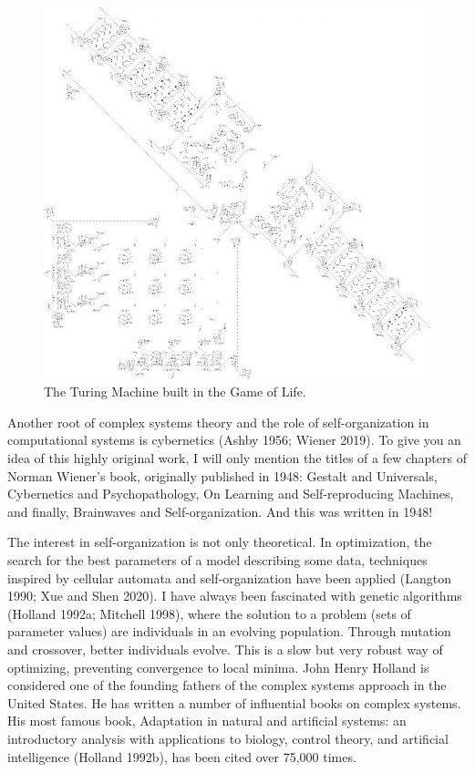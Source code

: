 \documentclass[
  a4paper,
  DIV=11,
  numbers=noendperiod,
  oneside]{scrreprt}
\begin{document}
\begin{figure}

{\centering \includegraphics{media/ch5n/image4.jpg}

}

\caption{\label{fig-ch5n-img4-old-42}The Turing Machine built in the
Game of Life.}

\end{figure}

Another root of complex systems theory and the role of self-organization
in computational systems is cybernetics (Ashby 1956; Wiener 2019). To
give you an idea of this highly original work, I will only mention the
titles of a few chapters of Norman Wiener's book, originally published
in 1948: Gestalt and Universals, Cybernetics and Psychopathology, On
Learning and Self-reproducing Machines, and finally, Brainwaves and
Self-organization. And this was written in 1948!

The interest in self-organization is not only theoretical. In
optimization, the search for the best parameters of a model describing
some data, techniques inspired by cellular automata and
self-organization have been applied (Langton 1990; Xue and Shen 2020). I
have always been fascinated with genetic algorithms (Holland 1992a;
Mitchell 1998), where the solution to a problem (sets of parameter
values) are individuals in an evolving population. Through mutation and
crossover, better individuals evolve. This is a slow but very robust way
of optimizing, preventing convergence to local minima. John Henry
Holland is considered one of the founding fathers of the complex systems
approach in the United States. He has written a number of influential
books on complex systems. His most famous book, Adaptation in natural
and artificial systems: an introductory analysis with applications to
biology, control theory, and artificial intelligence (Holland 1992b),
has been cited over 75,000 times.
\end{document}
